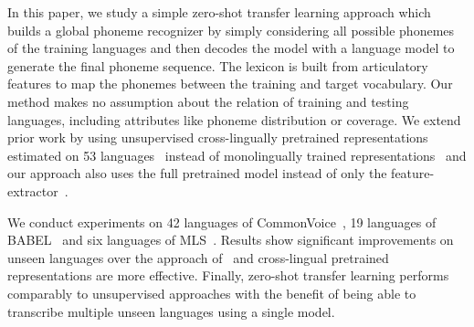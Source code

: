 \documentclass{article}
\newcommand{\ma}[1]{{\color{orange}#1}}
\newcommand{\qx}[1]{{\color{blue}#1}}
\begin{document}
In this paper, we study a simple zero-shot transfer learning approach which builds a global phoneme recognizer by simply considering all possible phonemes of the training languages and then decodes the model with a language model to generate the final phoneme sequence. 
The lexicon is built from articulatory features to map the phonemes between the training and target vocabulary. 
Our method makes no assumption about the relation of training and testing languages, including attributes like phoneme distribution or coverage.
We extend prior work by using unsupervised cross-lingually pretrained representations estimated on 53 languages~\cite{conneau2020unsupervised} instead of monolingually trained representations~\cite{gaozero} and our approach also uses the full pretrained model instead of only the feature-extractor~\cite{gaozero}.

We conduct experiments on 42 languages of CommonVoice~\cite{ardila2019common}, 19 languages of BABEL~\cite{gales2014speech} and six languages of MLS~\cite{pratap2020mls}. Results show significant improvements on unseen languages over the approach of~\cite{gaozero} and cross-lingual pretrained representations are more effective.
Finally, zero-shot transfer learning performs comparably to unsupervised approaches with the benefit of being able to transcribe multiple unseen languages using a single model.


\end{document}
